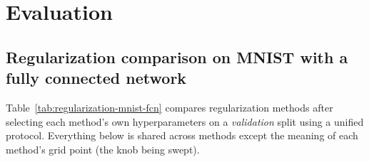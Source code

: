 \providecommand{\tbd}{\textemdash}

\section{Evaluation}
\label{sec:evaluation}

\subsection{Regularization comparison on MNIST with a fully connected network}
\label{subsec:reg-mnist-fcn}
Table~\ref{tab:regularization-mnist-fcn} compares regularization methods after selecting each method's own hyperparameters on a \emph{validation} split using a unified protocol. Everything below is shared across methods except the meaning of each method's grid point (the knob being swept).

